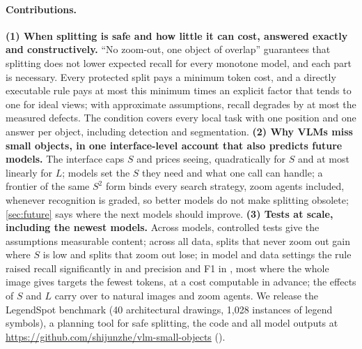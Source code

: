\paragraph{Contributions.}
\textbf{(1) When splitting is safe and how little it can cost, answered exactly and constructively.} ``No zoom-out, one object of overlap'' guarantees that splitting does not lower expected recall for every monotone model, and each part is necessary. Every protected split pays a minimum token cost, and a directly executable rule pays at most this minimum times an explicit factor that tends to one for ideal views; with approximate assumptions, recall degrades by at most the measured defects. The condition covers every local task with one position and one answer per object, including detection and segmentation.
\textbf{(2) Why VLMs miss small objects, in one interface-level account that also predicts future models.} The interface caps $S$ and prices seeing, quadratically for $S$ and at most linearly for $L$; models set the $S$ they need and what one call can handle; a frontier of the same $S^2$ form binds every search strategy, zoom agents included, whenever recognition is graded, so better models do not make splitting obsolete; \cref{sec:future} says where the next models should improve.
\textbf{(3) Tests at scale, including the newest models.} Across \CscaleModels{} models, controlled tests give the assumptions measurable content; across all data, splits that never zoom out gain where $S$ is low and splits that zoom out lose; in \CtCells{} model and data settings the rule raised recall significantly in \CtSigRec{} and precision and F1 in \CtSigPrec, most where the whole image gives targets the fewest tokens, at a cost computable in advance; the effects of $S$ and $L$ carry over to natural images and zoom agents.
We release the LegendSpot benchmark (40 architectural drawings, 1{,}028 instances of legend symbols), a planning tool for safe splitting, the code and all model outputs at \url{https://github.com/shijunzhe/vlm-small-objects} ().

